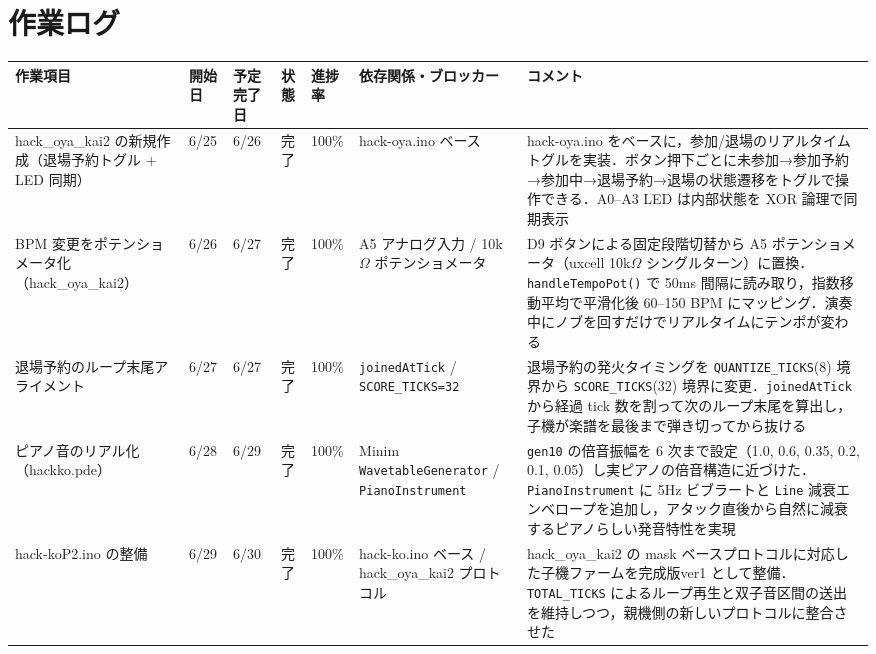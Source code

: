 \documentclass[a4paper,11pt]{ltjsarticle}
\providecommand{\％}{\%}
\begin{document}
\section{作業ログ}\label{sec:worklog}

\renewcommand{\arraystretch}{1.4}

\begingroup
\setlength{\tabcolsep}{3pt}
\sloppy
{\footnotesize
\begin{longtable}{|p{2.6cm}|p{1.1cm}|p{1.3cm}|p{1.0cm}|p{0.9cm}|p{2.2cm}|p{4.5cm}|}
\hline
\rowcolor[gray]{0.9}
作業項目 & 開始日 & 予定完了日 & 状態 & 進捗率 & 依存関係・ブロッカー & コメント \\
\hline
hack\_oya\_kai2 の新規作成（退場予約トグル + LED 同期） & 6/25 & 6/26 & 完了 & 100\％ & hack-oya.ino ベース & hack-oya.ino をベースに，参加/退場のリアルタイムトグルを実装．ボタン押下ごとに未参加→参加予約→参加中→退場予約→退場の状態遷移をトグルで操作できる．A0--A3 LED は内部状態を XOR 論理で同期表示 \\
\hline
BPM 変更をポテンショメータ化（hack\_oya\_kai2） & 6/26 & 6/27 & 完了 & 100\％ & A5 アナログ入力 / 10k$\Omega$ ポテンショメータ & D9 ボタンによる固定段階切替から A5 ポテンショメータ（uxcell 10k$\Omega$ シングルターン）に置換．\texttt{handleTempoPot()} で 50ms 間隔に読み取り，指数移動平均で平滑化後 60--150 BPM にマッピング．演奏中にノブを回すだけでリアルタイムにテンポが変わる \\
\hline
退場予約のループ末尾アライメント & 6/27 & 6/27 & 完了 & 100\％ & \texttt{joinedAtTick} / \texttt{SCORE\_TICKS=32} & 退場予約の発火タイミングを \texttt{QUANTIZE\_TICKS}(8) 境界から \texttt{SCORE\_TICKS}(32) 境界に変更．\texttt{joinedAtTick} から経過 tick 数を割って次のループ末尾を算出し，子機が楽譜を最後まで弾き切ってから抜ける \\
\hline
ピアノ音のリアル化（hackko.pde） & 6/28 & 6/29 & 完了 & 100\％ & Minim \texttt{WavetableGenerator} / \texttt{PianoInstrument} & \texttt{gen10} の倍音振幅を 6 次まで設定（1.0, 0.6, 0.35, 0.2, 0.1, 0.05）し実ピアノの倍音構造に近づけた．\texttt{PianoInstrument} に 5Hz ビブラートと \texttt{Line} 減衰エンベロープを追加し，アタック直後から自然に減衰するピアノらしい発音特性を実現 \\
\hline
hack-koP2.ino の整備 & 6/29 & 6/30 & 完了 & 100\％ & hack-ko.ino ベース / hack\_oya\_kai2 プロトコル & hack\_oya\_kai2 の mask ベースプロトコルに対応した子機ファームを完成版ver1 として整備．\texttt{TOTAL\_TICKS} によるループ再生と双子音区間の送出を維持しつつ，親機側の新しいプロトコルに整合させた \\
\hline
\end{longtable}
}
\endgroup
\end{document}
